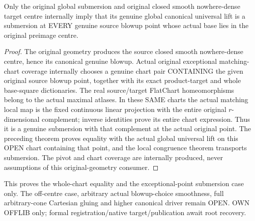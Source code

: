 \begin{theorem}
\label{hir:submersion-global-lift-original-exceptional-smooth}
\leanok
{}
Only the original global submersion and original closed smooth nowhere-dense target centre internally imply that its genuine global canonical universal lift is a submersion at EVERY genuine source blowup point whose actual base lies in the original preimage centre.
\end{theorem}
\begin{proof}
The original geometry produces the source closed smooth nowhere-dense centre, hence its canonical genuine blowup. Actual original exceptional matching-chart coverage internally chooses a genuine chart pair CONTAINING the given original source blowup point, together with its exact product-target and whole base-square dictionaries. The real source/target FlatChart homeomorphisms belong to the actual maximal atlases. In these SAME charts the actual matching local map is the fixed continuous linear projection with the entire original $r$-dimensional complement; inverse identities prove its entire chart expression. Thus it is a genuine submersion with that complement at the actual original point. The preceding theorem proves equality with the actual global universal lift on this OPEN chart containing that point, and the local congruence theorem transports submersion. The pivot and chart coverage are internally produced, never assumptions of this original-geometry consumer.
\end{proof}

This proves the whole-chart equality and the exceptional-point submersion case only. The off-centre case, arbitrary actual blowup-choice smoothness, full arbitrary-cone Cartesian gluing and higher canonical driver remain OPEN. OWN OFFLIB only; formal registration/native target/publication await root recovery.
